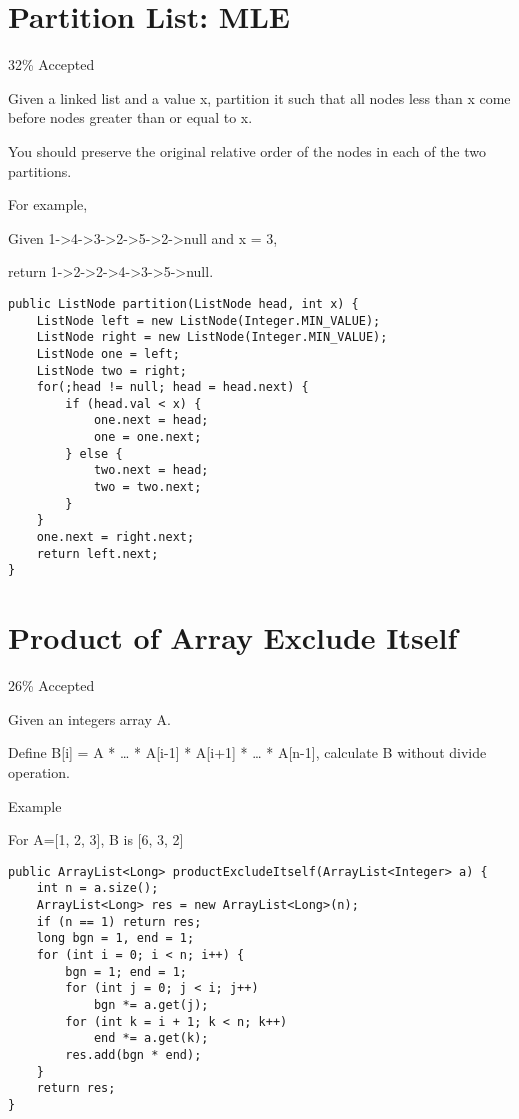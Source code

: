 \documentclass[9pt, b5paaper]{book}
\begin{document}
\section{Partition List: MLE}
\label{sec-5-52}

32\% Accepted

Given a linked list and a value x, partition it such that all nodes less than x come before nodes greater than or equal to x.

You should preserve the original relative order of the nodes in each of the two partitions.

For example,

Given 1->4->3->2->5->2->null and x = 3,

return 1->2->2->4->3->5->null.
\begin{verbatim}
public ListNode partition(ListNode head, int x) {
    ListNode left = new ListNode(Integer.MIN_VALUE);
    ListNode right = new ListNode(Integer.MIN_VALUE);
    ListNode one = left;
    ListNode two = right;
    for(;head != null; head = head.next) {
        if (head.val < x) {
            one.next = head;
            one = one.next;
        } else {
            two.next = head;
            two = two.next;
        }
    }
    one.next = right.next;
    return left.next;
}
\end{verbatim}
\section{Product of Array Exclude Itself}
\label{sec-5-53}

26\% Accepted

Given an integers array A.

Define B[i] = A\footnotemark[1]{} * \ldots{} * A[i-1] * A[i+1] * \ldots{} * A[n-1], calculate B without divide operation.

Example

For A=[1, 2, 3], B is [6, 3, 2]
\begin{verbatim}
public ArrayList<Long> productExcludeItself(ArrayList<Integer> a) {
    int n = a.size();
    ArrayList<Long> res = new ArrayList<Long>(n);
    if (n == 1) return res;
    long bgn = 1, end = 1;
    for (int i = 0; i < n; i++) {
        bgn = 1; end = 1;
        for (int j = 0; j < i; j++) 
            bgn *= a.get(j);
        for (int k = i + 1; k < n; k++) 
            end *= a.get(k);
        res.add(bgn * end);
    }
    return res;
}
\end{verbatim}
\end{document}
